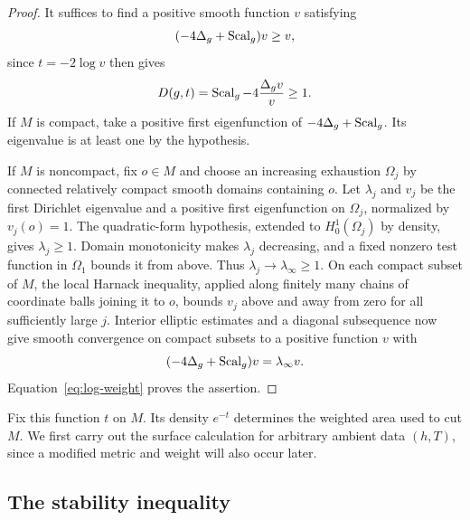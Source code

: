 \begin{proof}
It suffices to find a positive smooth function $v$ satisfying
\[
 (-4\Delta_g+\operatorname{Scal}_g)v\ge v,
\]
since $t=-2\log v$ then gives
\begin{equation}\label{eq:log-weight}
 D(g,t)=\operatorname{Scal}_g-4\frac{\Delta_gv}{v}\ge1.
\end{equation}
If $M$ is compact, take a positive first eigenfunction of
$-4\Delta_g+\operatorname{Scal}_g$.  Its eigenvalue is at least one by the hypothesis.

If $M$ is noncompact, fix $o\in M$ and choose an increasing exhaustion
$\Omega_j$ by connected relatively compact smooth domains containing
$o$.  Let $\lambda_j$ and $v_j$ be the first Dirichlet eigenvalue and a
positive first eigenfunction on $\Omega_j$, normalized by $v_j(o)=1$.
The quadratic-form hypothesis, extended to $H_0^1(\Omega_j)$ by density,
gives $\lambda_j\ge1$.  Domain monotonicity makes $\lambda_j$ decreasing,
and a fixed nonzero test function in $\Omega_1$ bounds it from above.
Thus $\lambda_j\to\lambda_\infty\ge1$.  On each compact subset of $M$,
the local Harnack inequality, applied along finitely many chains of
coordinate balls joining it to $o$, bounds $v_j$ above and away from zero
for all sufficiently large $j$.  Interior elliptic estimates
\cite[Theorems~6.2 and~8.20]{GilbargTrudinger2001} and a
diagonal subsequence now give smooth convergence on compact subsets to
a positive function $v$ with
\[
 (-4\Delta_g+\operatorname{Scal}_g)v=\lambda_\infty v.
\]
Equation~\eqref{eq:log-weight} proves the assertion.
\end{proof}

Fix this function $t$ on $M$.  Its density $e^{-t}$ determines the weighted
area used to cut $M$.  We first carry out the surface calculation for
arbitrary ambient data $(h,T)$, since a modified metric and weight will
also occur later.

\subsection{The stability inequality}

